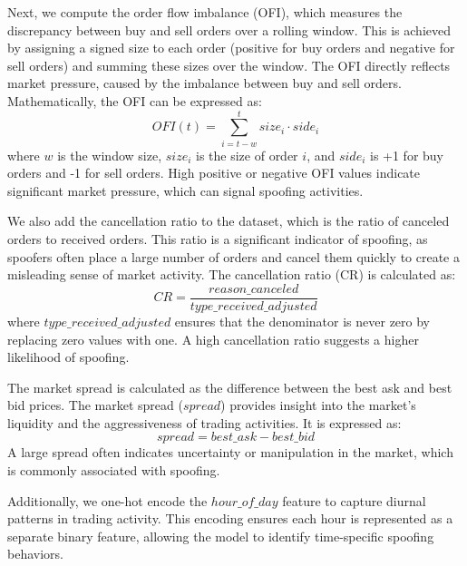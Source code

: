 \documentclass[conference]{IEEEtran}
\begin{document}
\par Next, we compute the order flow imbalance (OFI), which measures the discrepancy between buy and sell orders over a rolling window. This is achieved by assigning a signed size to each order (positive for buy orders and negative for sell orders) and summing these sizes over the window. The OFI directly reflects market pressure, caused by the imbalance between buy and sell orders. Mathematically, the OFI can be expressed as:
\begin{equation}
OFI(t) = \sum_{i=t-w}^{t} size_i \cdot side_i
\end{equation}
where $w$ is the window size, $size_i$ is the size of order $i$, and $side_i$ is +1 for buy orders and -1 for sell orders. High positive or negative OFI values indicate significant market pressure, which can signal spoofing activities.

\par We also add the cancellation ratio to the dataset, which is the ratio of canceled orders to received orders. This ratio is a significant indicator of spoofing, as spoofers often place a large number of orders and cancel them quickly to create a misleading sense of market activity. The cancellation ratio (CR) is calculated as:
\begin{equation}
CR = \frac{reason\_canceled}{type\_received\_adjusted}
\end{equation}
where $type\_received\_adjusted$ ensures that the denominator is never zero by replacing zero values with one. A high cancellation ratio suggests a higher likelihood of spoofing.

\par The market spread is calculated as the difference between the best ask and best bid prices. The market spread ($spread$) provides insight into the market's liquidity and the aggressiveness of trading activities. It is expressed as:
\begin{equation}
spread = best\_ask - best\_bid
\end{equation}
A large spread often indicates uncertainty or manipulation in the market, which is commonly associated with spoofing.

\par Additionally, we one-hot encode the $hour\_of\_day$ feature to capture diurnal patterns in trading activity. This encoding ensures each hour is represented as a separate binary feature, allowing the model to identify time-specific spoofing behaviors.
\end{document}
